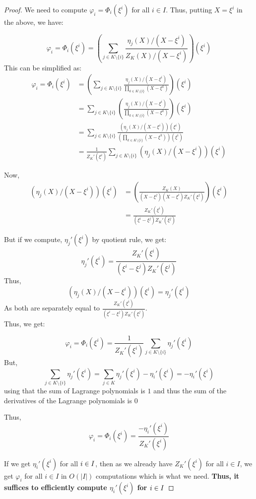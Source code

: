 \begin{proof}
    We need to compute $\varphi_i=\Phi_i(\xi^i)$ for all $i \in I$. Thus, putting $X=\xi^i$ in the above, we have:

    $$\varphi_i = \Phi_i(\xi^i) = \left(\sum_{j\in K\setminus \{i\}}\frac{\eta_j(X)/(X-\xi^i)}{Z_K(X)/(X-\xi^i)}\right)(\xi^i)$$
    This can be simplified as:
    \begin{align*}\varphi_i = \Phi_i(\xi^i) &= \left(\sum_{j\in K\setminus \{i\}}\frac{\eta_j(X)/(X-\xi^i)}{\prod_{k \in K \setminus \{i\}}(X-\xi^k)}\right)(\xi^i)\\
    &= \sum_{j\in K\setminus \{i\}}\left(\frac{\eta_j(X)/(X-\xi^i)}{\prod_{k \in K \setminus \{i\}}(X-\xi^k)}\right)(\xi^i)\\
    &= \sum_{j\in K\setminus \{i\}}\frac{\left(\eta_j(X)/(X-\xi^i)\right)(\xi^i)}{\left(\prod_{k \in K \setminus \{i\}}(X-\xi^k)\right)(\xi^i)}\\
    &= \frac{1}{Z_K'(\xi^i)}\sum_{j\in K\setminus \{i\}}\left(\eta_j(X)/(X-\xi^i)\right)(\xi^i)
    \end{align*}

    Now, \begin{align*}
             \left(\eta_j(X)/(X-\xi^i)\right)(\xi^i)&=\left(\frac{Z_K(X)}{(X-\xi^j)(X-\xi^i)Z_K'(\xi^j)}\right)(\xi^i)\\
             &= \frac{Z_K'(\xi^i)}{(\xi^i-\xi^j)Z_K'(\xi^j)}
    \end{align*}

    But if we compute, $\eta_j'(\xi^i)$ by quotient rule, we get:
    $$\eta_j'(\xi^i)=\frac{Z_K'(\xi^i)}{(\xi^i-\xi^j)Z_K'(\xi^j)}$$
    Thus,
    $$\left(\eta_j(X)/(X-\xi^i)\right)(\xi^i)=\eta_j'(\xi^i) $$
    As both are separately equal to $\frac{Z_K'(\xi^i)}{(\xi^i-\xi^j)Z_K'(\xi^j)}$.\\
    Thus, we get:


    $$\varphi_i =\Phi_i(\xi^i) =  \frac{1}{Z_K'(\xi^i)}\sum_{j\in K\setminus \{i\}}\eta_j'(\xi^i)$$
    But, $$\sum_{j\in K\setminus \{i\}}\eta_j'(\xi^i)= \sum_{j\in K}\eta_j'(\xi^i)-\eta_i'(\xi^i)=-\eta_i'(\xi^i)$$
    using that the sum of Lagrange polynomials is $1$ and thus the sum of the derivatives of the Lagrange polynomials is $0$

    Thus,
    $$\varphi_i =\Phi_i(\xi^i) = \frac{-\eta_i'(\xi^i)}{Z_K'(\xi^i)}$$

    If we get $\eta_i'(\xi^i)$ for all $i\in I$, then as we already have $Z_K'(\xi^i)$ for all $i \in I$, we get $\varphi_i$ for all $i \in I$ in $O(|I|)$ computations which is what we need. \textbf{Thus, it suffices to efficiently compute $\eta_i'(\xi^i)$ for $i\in I$}


\end{proof}

